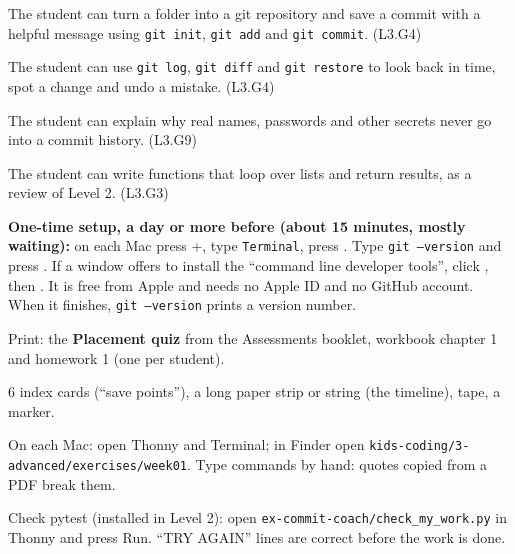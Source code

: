 
\begin{objectives}
  \item The student can turn a folder into a git repository and save a commit with a helpful message using \texttt{git init}, \texttt{git add} and \texttt{git commit}. (L3.G4)
  \item The student can use \texttt{git log}, \texttt{git diff} and \texttt{git restore} to look back in time, spot a change and undo a mistake. (L3.G4)
  \item The student can explain why real names, passwords and other secrets never go into a commit history. (L3.G9)
  \item The student can write functions that loop over lists and return results, as a review of Level 2. (L3.G3)
\end{objectives}

\begin{materials}
  \item \textbf{One-time setup, a day or more before (about 15 minutes, mostly waiting):} on each Mac press +, type \texttt{Terminal}, press . Type \texttt{git --version} and press . If a window offers to install the \enquote{command line developer tools}, click , then . It is free from Apple and needs no Apple ID and no GitHub account. When it finishes, \texttt{git --version} prints a version number.
  \item Print: the \textbf{Placement quiz} from the Assessments booklet, workbook chapter 1 and homework 1 (one per student).
  \item 6 index cards (\enquote{save points}), a long paper strip or string (the timeline), tape, a marker.
  \item On each Mac: open Thonny and Terminal; in Finder open \texttt{kids-coding/3-advanced/exercises/week01}. Type commands by hand: quotes copied from a PDF break them.
  \item Check pytest (installed in Level 2): open \texttt{ex-commit-coach/check\_my\_work.py} in Thonny and press Run. \enquote{TRY AGAIN} lines are correct before the work is done.
\end{materials}

